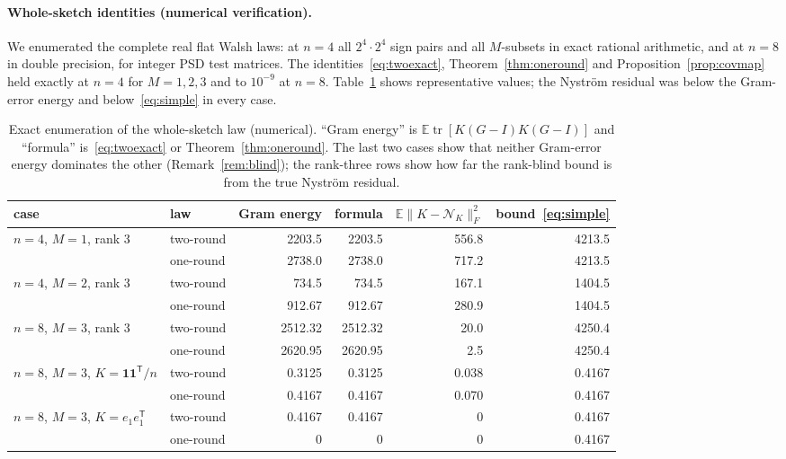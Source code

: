 \documentclass[11pt,a4paper]{article}
\theoremstyle{definition}
\theoremstyle{remark}
\numberwithin{equation}{section}
\newcommand{\E}{\mathbb E}
\newcommand{\tr}{\operatorname{tr}}
\newcommand{\norm}[1]{\lVert#1\rVert}
\newcommand{\Nys}{\mathcal N}
\begin{document}
\paragraph{Whole-sketch identities (numerical verification).}
We enumerated the complete real flat Walsh laws: at $n=4$ all $2^4\cdot2^4$
sign pairs and all $M$-subsets in exact rational arithmetic, and at $n=8$ in
double precision, for integer PSD test matrices. The identities~\eqref{eq:twoexact},
Theorem~\ref{thm:oneround} and Proposition~\ref{prop:covmap} held exactly at
$n=4$ for $M=1,2,3$ and to $10^{-9}$ at $n=8$. Table~\ref{tab:whole} shows
representative values; the Nystr\"om residual was below the Gram-error energy
and below~\eqref{eq:simple} in every case.

\begin{table}[ht]
\centering\small
\setlength{\tabcolsep}{4pt}
\begin{tabular}{llrrrr}
\toprule
case & law & Gram energy & formula & $\E\norm{K-\Nys_K}_F^2$ & bound~\eqref{eq:simple}\\
\midrule
$n=4$, $M=1$, rank 3 & two-round & 2203.5 & 2203.5 & 556.8 & 4213.5\\
 & one-round & 2738.0 & 2738.0 & 717.2 & 4213.5\\
$n=4$, $M=2$, rank 3 & two-round & 734.5 & 734.5 & 167.1 & 1404.5\\
 & one-round & 912.67 & 912.67 & 280.9 & 1404.5\\
$n=8$, $M=3$, rank 3 & two-round & 2512.32 & 2512.32 & 20.0 & 4250.4\\
 & one-round & 2620.95 & 2620.95 & 2.5 & 4250.4\\
$n=8$, $M=3$, $K=\mathbf 1\mathbf 1^{\mathsf T}/n$ & two-round & 0.3125 & 0.3125 & 0.038 & 0.4167\\
 & one-round & 0.4167 & 0.4167 & 0.070 & 0.4167\\
$n=8$, $M=3$, $K=e_1e_1^{\mathsf T}$ & two-round & 0.4167 & 0.4167 & 0 & 0.4167\\
 & one-round & 0 & 0 & 0 & 0.4167\\
\bottomrule
\end{tabular}
\caption{Exact enumeration of the whole-sketch law (numerical). ``Gram energy''
is $\E\tr[K(G-I)K(G-I)]$ and ``formula'' is~\eqref{eq:twoexact} or
Theorem~\ref{thm:oneround}. The last two
cases show that neither Gram-error energy dominates the other
(Remark~\ref{rem:blind}); the rank-three rows show how far the rank-blind bound
is from the true Nystr\"om residual.}
\label{tab:whole}
\end{table}
\end{document}
